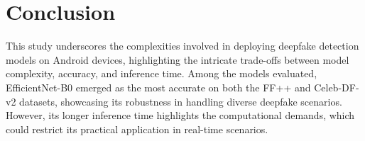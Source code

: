 \documentclass[10pt,twocolumn,letterpaper]{article}
\begin{document}
\begin{table}[t]
\centering
{}
\caption{Performance on both Df++ and Celeb DF V2}
\label{tab:acc}
\end{table}



\begin{table}[t]
\centering
{}
\caption{Performance on android mobile device}
\label{tab:time}
\end{table}

\section{Conclusion}
This study underscores the complexities involved in deploying deepfake detection models on Android devices, highlighting the intricate trade-offs between model complexity, accuracy, and inference time. Among the models evaluated, EfficientNet-B0\cite{tan2020efficientnet} emerged as the most accurate on both the FF++\cite{Rossler_2019_ICCV} and Celeb-DF-v2\cite{li2020celebdf} datasets, showcasing its robustness in handling diverse deepfake scenarios. However, its longer inference time highlights the computational demands, which could restrict its practical application in real-time scenarios.
\end{document}
